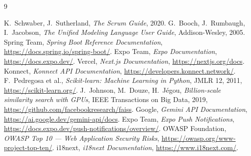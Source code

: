 \documentclass[a4paper,12pt]{report}
\begin{document}
\begin{thebibliography}{9}

 K.~Schwaber, J.~Sutherland, \emph{The Scrum Guide}, 2020.
 G.~Booch, J.~Rumbaugh, I.~Jacobson, \emph{The Unified Modeling
Language User Guide}, Addison-Wesley, 2005.
 Spring Team, \emph{Spring Boot Reference Documentation},
\url{https://docs.spring.io/spring-boot/}.
 Expo Team, \emph{Expo Documentation},
\url{https://docs.expo.dev/}.
 Vercel, \emph{Next.js Documentation},
\url{https://nextjs.org/docs}.
 Konnect, \emph{Konnect API Documentation},
\url{https://developers.konnect.network/}.
 F.~Pedregosa et al., \emph{Scikit-learn: Machine Learning
in Python}, JMLR 12, 2011, \url{https://scikit-learn.org/}.
 J.~Johnson, M.~Douze, H.~J\'egou, \emph{Billion-scale
similarity search with GPUs}, IEEE Transactions on Big Data, 2019,
\url{https://github.com/facebookresearch/faiss}.
 Google, \emph{Gemini API Documentation},
\url{https://ai.google.dev/gemini-api/docs}.
 Expo Team, \emph{Expo Push Notifications},
\url{https://docs.expo.dev/push-notifications/overview/}.
 OWASP Foundation, \emph{OWASP Top 10 --- Web Application
Security Risks}, \url{https://owasp.org/www-project-top-ten/}.
 i18next, \emph{i18next Documentation},
\url{https://www.i18next.com/}.

\end{thebibliography}
\end{document}
